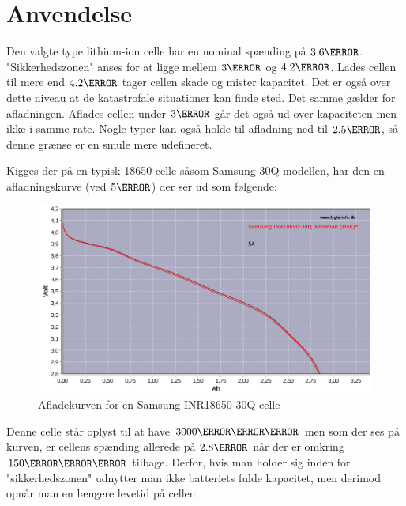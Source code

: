 \section{Anvendelse}
Den valgte type lithium-ion celle har en nominal spænding på $3.6\volt$. "Sikkerhedszonen" \space anses for at ligge mellem $3\volt$ og $4.2\volt$. Lades cellen til mere end $4.2\volt$ tager cellen skade og mister kapacitet. Det er også over dette niveau at de katastrofale situationer kan finde sted. Det samme gælder for afladningen. Aflades cellen under $3\volt$ går det også ud over kapaciteten men ikke i samme rate. Nogle typer kan også holde til afladning ned til $2.5\volt$, så denne grænse er en smule mere udefineret.\\

Kigges der på en typisk 18650 celle såsom Samsung 30Q modellen, har den en afladningskurve (ved $5\ampere$) der ser ud som følgende: 

\begin{figure}[h]
\centering
\includegraphics[width=15cm]{billeder/samsung-inr18650-discharge.png}
\caption{Afladekurven for en Samsung INR18650 30Q celle\protect\footnotemark}
\label{fig:30q_discharge}
\end{figure}

Denne celle står oplyst til at have $3000\milli\ampere\hour$ men som der ses på kurven, er cellens spænding allerede på $2.8\volt$ når der er omkring $150\milli\ampere\hour$ tilbage. Derfor, hvis man holder sig inden for "sikkerhedszonen" \space udnytter man ikke batteriets fulde kapacitet, men derimod opnår man en længere levetid på cellen. \\

